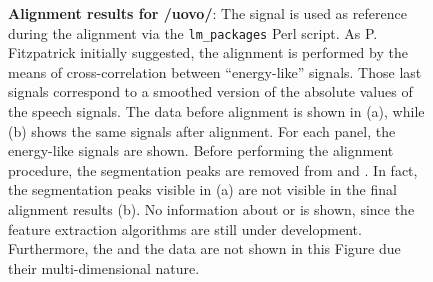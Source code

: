 \begin{figure}
  \centering
	\hspace{0.05\textwidth}

	\caption[Alignment results for /uovo/]{\textbf{Alignment
	results for /uovo/}: 
	The  signal is used as reference during the alignment via the
	{\tt lm\_packages} Perl script.
	As P. Fitzpatrick initially suggested, the alignment is performed by
	the means of cross-correlation between ``energy-like'' signals.
	Those last signals correspond to a smoothed version of the absolute values
	of the speech signals.
	The data before alignment is shown in (a), while (b) shows the same signals
	after alignment.
	For each panel, the energy-like signals are shown. 
	Before performing the alignment procedure, the segmentation 
	peaks are removed from  and . In fact, the
	segmentation peaks visible in (a) are not visible in the final alignment 
	results (b).
	No information  about  or  is shown, since the
	feature extraction algorithms are still under development.
	Furthermore, the  and the  data are not shown in this
	Figure due their multi-dimensional nature.
	}
	\label{fig:results:uovo:aln}
\end{figure}
